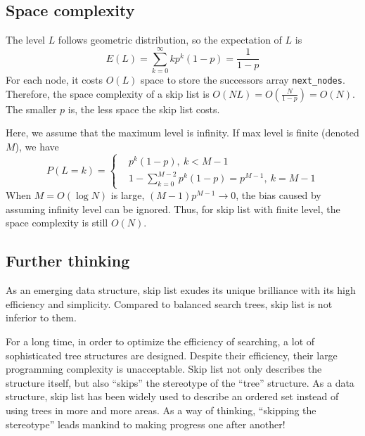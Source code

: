 \subsection{Space complexity}
The level $L$ follows geometric distribution, so the expectation of $L$ is
\[
    E(L) = \sum_{k=0}^\infty kp^k(1-p) = \frac{1}{1-p}
\]
For each node, it costs $O(L)$ space to store the successors array \texttt{next\_nodes}. Therefore, the space complexity of a skip list is $O(NL)=O(\frac{N}{1-p})=O(N)$. The smaller $p$ is, the less space the skip list costs.\par
Here, we assume that the maximum level is infinity. If max level is finite (denoted $M$), we have
\[
    P(L=k)=\left\{
        \begin{aligned}
            &p^k(1-p),\ k<M-1\\
            &1-\sum_{k=0}^{M-2}p^k(1-p)=p^{M-1},\ k=M-1
        \end{aligned}
        \right.
\]
When $M=O(\log{N})$ is large, $(M-1)p^{M-1}\to0$, the bias caused by assuming infinity level can be ignored. Thus, for skip list with finite level, the space complexity is still $O(N)$. 

\subsection{Further thinking}
As an emerging data structure, skip list exudes its unique brilliance with its high efficiency and simplicity. Compared to balanced search trees, skip list is not inferior to them.\par
For a long time, in order to optimize the efficiency of searching, a lot of sophisticated tree structures are designed. Despite their efficiency, their large programming complexity is unacceptable. Skip list not only describes the structure itself, but also ``skips'' the stereotype of the ``tree'' structure. As a data structure, skip list has been widely used to describe an ordered set instead of using trees in more and more areas. As a way of thinking, ``skipping the stereotype'' leads mankind to making progress one after another!